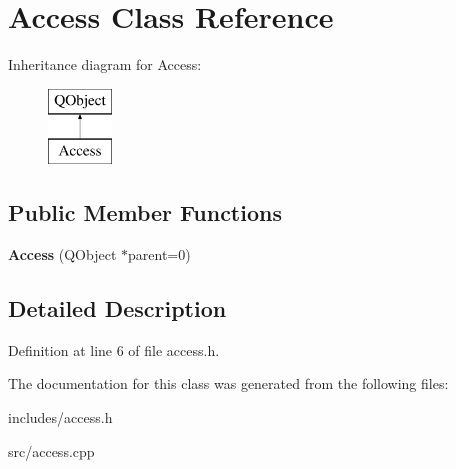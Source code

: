 \hypertarget{classAccess}{}\section{Access Class Reference}
\label{classAccess}
Inheritance diagram for Access\+:\begin{figure}[H]
\begin{center}
\leavevmode
\includegraphics[height=2.000000cm]{classAccess}
\end{center}
\end{figure}
\subsection*{Public Member Functions}
\begin{DoxyCompactItemize}
\item 
\mbox{\label{classAccess_aef16806d0a5a57d9ca6f4d83abddfbd8}} 
{\bfseries Access} (Q\+Object $\ast$parent=0)
\end{DoxyCompactItemize}


\subsection{Detailed Description}


Definition at line 6 of file access.\+h.



The documentation for this class was generated from the following files\+:\begin{DoxyCompactItemize}
\item 
includes/access.\+h\item 
src/access.\+cpp\end{DoxyCompactItemize}
